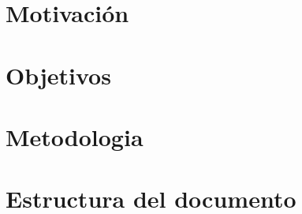 \section{Motivación}
    
    \cite{DominguezRivas2020}
\section{Objetivos}
    
\section{Metodologia}
    
\section{Estructura del documento}
    